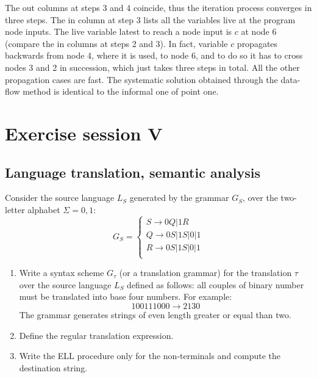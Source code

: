 \documentclass[12pt, a4paper]{report}
\newtheorem[style=M, bodystyle=\normalfont]{theorem}{Theorem}
\newtheorem[style=M, bodystyle=\normalfont]{corollary}{Corollary}
\newtheorem[style=M, bodystyle=\normalfont]{lemma}{Lemma}
\newtheorem[style=M, bodystyle=\normalfont]{definition}{Definition}
\begin{document}
\begin{enumerate}
\begin{figure}[H]
                \end{figure} 
                The out columns at steps 3 and 4 coincide, thus the iteration process converges in three steps. The in column at step 3 lists all the variables
                live at the program node inputs. The live variable latest to reach a node input is $c$ at node 6 (compare the in columns at steps 2 and 3). In fact, 
                variable $c$ propagates backwards from node 4, where it is used, to node 6, and to do so it has to cross nodes 3 and 2 in succession, which just takes 
                three steps in total. All the other propagation cases are fast. The systematic solution obtained through the data-flow method is identical to the informal 
                one of point one. 
        \end{enumerate}

\newpage 

\chapter{Exercise session V}
    \section{Language translation, semantic analysis}
        Consider the source language $L_S$ generated by the grammar $G_S$, over the two-letter alphabet $\Sigma= {0,1}$:
        \[G_S=\begin{cases}
            S \rightarrow 0Q|1R     \\
            Q \rightarrow 0S|1S|0|1 \\
            R \rightarrow 0S|1S|0|1 \\
        \end{cases}\]
        \begin{enumerate}
            \item Write a syntax scheme $G_{\tau}$ (or a translation grammar) for the translation $\tau$ over the source language $L_S$ defined as follows: 
                all couples of binary number must be translated into base four numbers. For example: 
                \[100111000 \rightarrow 2130\]
                The grammar generates strings of even length greater or equal than two. 
            \item Define the regular translation expression.
            \item Write the ELL procedure only for the non-terminals and compute the destination string. 
        \end{enumerate}
\end{document}

